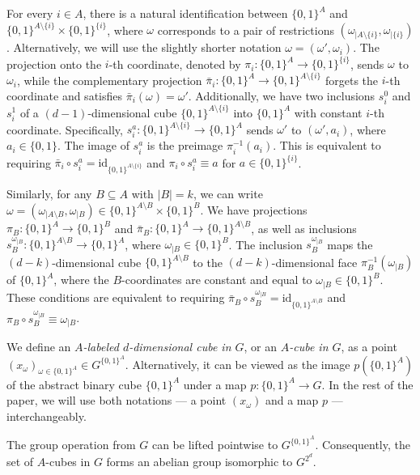 \documentclass{amsart}
\theoremstyle{definition}
\theoremstyle{remark}
\numberwithin{equation}{section}
\begin{document}
For every $i \in A$, there is a natural identification between $\{0,1\}^A$ and $\{0,1\}^{A \setminus \{ i\} } \times \{0,1\}^{\{i\} }$, where $\omega$ corresponds to a pair of restrictions $(\omega_{|A\setminus \{i\}}, \omega_{|\{i\}}) $. Alternatively, we will use the slightly shorter notation $\omega=(\omega', \omega_i)$. The projection onto the $i$-th coordinate, denoted by $\pi_i : \{0,1\}^ A \to \{0,1\}^{\{i\}}$, sends $\omega$ to $\omega_i$, while the complementary projection $\bar{\pi}_i : \{0,1\}^A \to \{0,1\}^{A \setminus \{i\}}$ forgets the $i$-th coordinate and satisfies $\bar \pi_i (\omega) = \omega'$. Additionally, we have two inclusions $s_i^0$ and $s_i^1$ of a $(d-1)$-dimensional cube $\{0,1\}^{A \setminus \{i\}}$ into $\{0,1\}^A$ with constant $i$-th coordinate. Specifically, $s_i^a : \{0,1\}^{A \setminus \{i\}} \to \{0,1\}^{A} $ sends $\omega'$ to $(\omega',a_i)$, where $a_i \in \{0,1\}$. The image of $s_i^a$ is the preimage $\pi_i^{-1}(a_i)$. 
This is equivalent to requiring $\bar \pi_i \circ s_i^a = \mathrm{id}_{\{0,1\}^{A \setminus \{i\}}}$ and $\pi_i \circ s_i^a \equiv a$ for $a \in \{0,1\}^{\{i\}}$.

Similarly, for any $B\subseteq A$ with $|B|=k$, we can write $\omega = (\omega_{|A\setminus B}, \omega_{|B}) \in  \{0,1\}^{A \setminus B} \times \{0,1\}^{B}$. We have projections $\pi_B : \{0,1\}^ A \to \{0,1\}^{B}$ and $\bar{\pi}_B : \{0,1\}^A \to \{0,1\}^{A \setminus B}$, as well as inclusions $s_{B}^{\omega_{|B}}: \{0,1\}^{A\setminus B} \to \{0,1\}^A$, where $\omega_{|B} \in \{0,1\}^B$. The inclusion $s_{B}^{\omega_{|B}}$ maps the $(d-k)$-dimensional cube $\{0,1\}^{A \setminus B}$ to the $(d-k)$-dimensional face $\pi_B^{-1}(\omega_{|B})$ of $\{0,1\}^{A}$, where the $B$-coordinates are constant and equal to $\omega_{|B} \in \{0,1\}^B$. These conditions are equivalent to requiring $\bar \pi_B \circ s_{B}^{\omega_{|B}} = \mathrm{id}_{\{0,1\}^{A \setminus B}}$ and $\pi_B \circ s_B^{\omega_{|B}} \equiv \omega_{|B}$. 


We define an \textit{$A$-labeled $d$-dimensional cube in $G$}, or an \textit{$A$-cube in $G$}, as a point $\left( x_\omega \right)_{\omega \in \{0,1\}^A} \in G^{\{0,1\}^A}$. Alternatively, it can be viewed as the image $p(\{0,1\}^A)$ of the abstract binary cube $\{0,1\}^A$ under a map $p: \{0,1\}^A \to G$. In the rest of the paper, we will use both notations --- a point $(x_\omega)$ and a map $p$ --- interchangeably.

The group operation from $G$ can be lifted pointwise to $G^{\{0,1\}^A}$. Consequently, the set of $A$-cubes in $G$ forms an abelian group isomorphic to $G^{2^d}$. 
\end{document}
